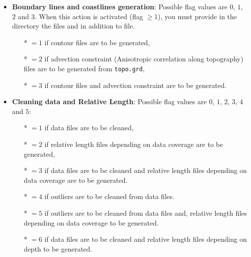 \begin{itemize}
{\bf Note:} the files without any depth axis are treated separately by . The minimum and maximum
instrument depth (metadata) are used to recreate an artificial depth axis which can be used by diva. Please note that, in this case,
each file without depth axis (in datasource) should contain only one location (otherwise, the other ones are not used). 
This script also handles the current direction (CurrDir [deg T]) and speed (CurrSpd [cm/s]) and transforms them
into x-y components (North, East). In this second case, depth axis has to be present. In any case, 
can only deal with a maximum of 2 scalar variables (+ current direction and speed). If you need to analyse more than 2 scalar 
variables, you can proceed by steps (just changing the ).

\item {\bf Boundary lines and coastlines generation}: Possible flag values are $0$, $1$, $2$ and $3$. When this action is activated (flag $\geq 1$), you must provide in the  directory the files  and   in addition to  file.
              \begin{itemize}
                \item[*] $=1$ if contour files are to be generated,
                \item[*] $=2$ if advection constraint (Anisotropic correlation along topography) files are to be generated from  \texttt{topo.grd},
                \item[*] $=3$ if contour files and advection constraint are to be generated.
              \end{itemize}

\item {\bf Cleaning data and Relative Length}: Possible flag values are $0$, $1$, $2$, $3$, $4$ and $5$:
              \begin{itemize}
                \item[*] $=1$ if data files are to be cleaned,
                \item[*] $=2$ if relative length files depending on data coverage are to be generated,
                \item[*] $=3$ if data files are to be cleaned and relative length files depending on data coverage are to be generated.
                \item[*] $=4$ if outliers are to be cleaned from data files.
                \item[*] $=5$ if outliers are to be cleaned from data files and, relative length files depending on data coverage to be generated.
                \item[*] $=6$ if data files are to be cleaned and relative length files depending on depth to be generated.
              \end{itemize}


\end{itemize}
